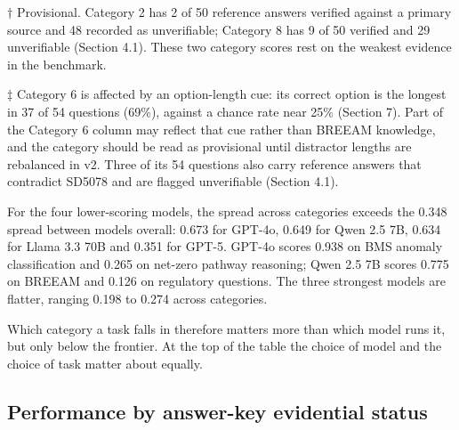 \documentclass[11pt,a4paper]{article}
\begin{document}
$\dagger$ Provisional. Category 2 has 2 of 50 reference answers verified against a primary source and 48 recorded as unverifiable; Category 8 has 9 of 50 verified and 29 unverifiable (Section 4.1). These two category scores rest on the weakest evidence in the benchmark.

$\ddagger$ Category 6 is affected by an option-length cue: its correct option is the longest in 37 of 54 questions (69\%), against a chance rate near 25\% (Section 7). Part of the Category 6 column may reflect that cue rather than BREEAM knowledge, and the category should be read as provisional until distractor lengths are rebalanced in v2. Three of its 54 questions also carry reference answers that contradict SD5078 and are flagged unverifiable (Section 4.1).

For the four lower-scoring models, the spread across categories exceeds the 0.348 spread between models overall: 0.673 for GPT-4o, 0.649 for Qwen 2.5 7B, 0.634 for Llama 3.3 70B and 0.351 for GPT-5. GPT-4o scores 0.938 on BMS anomaly classification and 0.265 on net-zero pathway reasoning; Qwen 2.5 7B scores 0.775 on BREEAM and 0.126 on regulatory questions. The three strongest models are flatter, ranging 0.198 to 0.274 across categories.

Which category a task falls in therefore matters more than which model runs it, but only below the frontier. At the top of the table the choice of model and the choice of task matter about equally.

\subsection{Performance by answer-key evidential status}

\begin{center}
\end{center}
\end{document}
